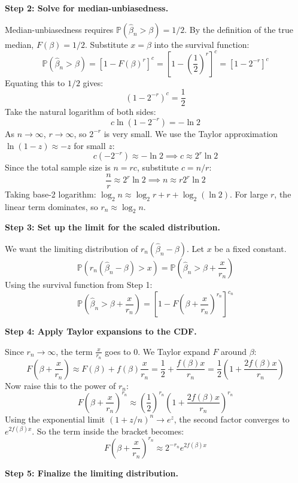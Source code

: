 \begin{solution}
\textbf{Step 2: Solve for median-unbiasedness.}

Median-unbiasedness requires $\mathbb{P}(\hat{\beta}_n > \beta) = 1/2$.
By the definition of the true median, $F(\beta) = 1/2$. Substitute $x = \beta$ into the survival function:
\[ \mathbb{P}(\hat{\beta}_n > \beta) = \left[ 1 - F(\beta)^r \right]^c = \left[ 1 - \left(\frac{1}{2}\right)^r \right]^c = \left[ 1 - 2^{-r} \right]^c \]
Equating this to $1/2$ gives:
\[ \left( 1 - 2^{-r} \right)^c = \frac{1}{2} \]
Take the natural logarithm of both sides:
\[ c \ln(1 - 2^{-r}) = -\ln 2 \]
As $n \to \infty$, $r \to \infty$, so $2^{-r}$ is very small. We use the Taylor approximation $\ln(1-z) \approx -z$ for small $z$:
\[ c (-2^{-r}) \approx -\ln 2 \implies c \approx 2^r \ln 2 \]
Since the total sample size is $n = rc$, substitute $c = n/r$:
\[ \frac{n}{r} \approx 2^r \ln 2 \implies n \approx r 2^r \ln 2 \]
Taking base-2 logarithm: $\log_2 n \approx \log_2 r + r + \log_2(\ln 2)$. For large $r$, the linear term dominates, so $r_n \approx \log_2 n$.

\textbf{Step 3: Set up the limit for the scaled distribution.}

We want the limiting distribution of $r_n(\hat{\beta}_n - \beta)$. Let $x$ be a fixed constant.
\[ \mathbb{P}(r_n(\hat{\beta}_n - \beta) > x) = \mathbb{P}\left(\hat{\beta}_n > \beta + \frac{x}{r_n}\right) \]
Using the survival function from Step 1:
\[ \mathbb{P}\left(\hat{\beta}_n > \beta + \frac{x}{r_n}\right) = \left[ 1 - F\left(\beta + \frac{x}{r_n}\right)^{r_n} \right]^{c_n} \]

\textbf{Step 4: Apply Taylor expansions to the CDF.}

Since $r_n \to \infty$, the term $\frac{x}{r_n}$ goes to 0. We Taylor expand $F$ around $\beta$:
\[ F\left(\beta + \frac{x}{r_n}\right) \approx F(\beta) + f(\beta) \frac{x}{r_n} = \frac{1}{2} + \frac{f(\beta)x}{r_n} = \frac{1}{2} \left( 1 + \frac{2f(\beta)x}{r_n} \right) \]
Now raise this to the power of $r_n$:
\[ F\left(\beta + \frac{x}{r_n}\right)^{r_n} \approx \left( \frac{1}{2} \right)^{r_n} \left( 1 + \frac{2f(\beta)x}{r_n} \right)^{r_n} \]
Using the exponential limit $(1 + z/n)^n \to e^z$, the second factor converges to $e^{2f(\beta)x}$.
So the term inside the bracket becomes:
\[ F\left(\beta + \frac{x}{r_n}\right)^{r_n} \approx 2^{-r_n} e^{2f(\beta)x} \]

\textbf{Step 5: Finalize the limiting distribution.}


\end{solution}
